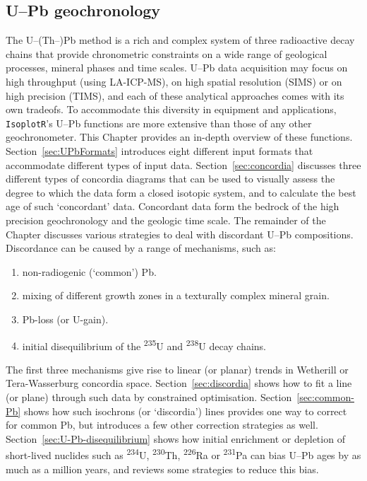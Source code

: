 \begin{refsection}
  
\chapter{U--Pb geochronology}\label{ch:U-Pb}

  The U--(Th--)Pb method is a rich and complex system of three
  radioactive decay chains that provide chronometric constraints on a
  wide range of geological processes, mineral phases and time scales.
  U--Pb data acquisition may focus on high throughput (using
  LA-ICP-MS), on high spatial resolution (SIMS) or on high precision
  (TIMS), and each of these analytical approaches comes with its own
  tradeofs. To accommodate this diversity in equipment and
  applications, \texttt{IsoplotR}'s U--Pb functions are more extensive
  than those of any other geochronometer. This Chapter provides an
  in-depth overview of these functions.\\

  Section~\ref{sec:UPbFormats} introduces eight different input
  formats that accommodate different types of input
  data. Section~\ref{sec:concordia} discusses three different types of
  concordia diagrams that can be used to visually assess the degree to
  which the data form a closed isotopic system, and to calculate the
  best age of such `concordant' data. Concordant data form the bedrock
  of the high precision geochronology and the geologic time scale.
  The remainder of the Chapter discusses various strategies to deal
  with discordant U--Pb compositions. Discordance can be caused by a
  range of mechanisms, such as:

  \begin{enumerate}
    \item non-radiogenic (`common') Pb.
    \item mixing of different growth zones in a texturally complex
      mineral grain.
    \item Pb-loss (or U-gain).
    \item initial disequilibrium of the \textsuperscript{235}U and
      \textsuperscript{238}U decay chains.
  \end{enumerate}

  The first three mechanisms give rise to linear (or planar) trends in
  Wetherill or Tera-Wasserburg concordia
  space. Section~\ref{sec:discordia} shows how to fit a line (or
  plane) through such data by constrained
  optimisation. Section~\ref{sec:common-Pb} shows how such isochrons
  (or `discordia') lines provides one way to correct for common Pb,
  but introduces a few other correction strategies as well.
  Section~\ref{sec:U-Pb-disequilibrium} shows how initial enrichment or
  depletion of short-lived nuclides such as \textsuperscript{234}U,
  \textsuperscript{230}Th, \textsuperscript{226}Ra or
  \textsuperscript{231}Pa can bias U--Pb ages by as much as a million
  years, and reviews some strategies to reduce this bias.


\end{refsection}
